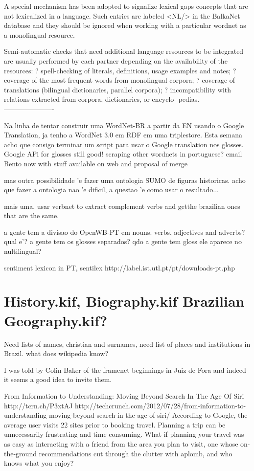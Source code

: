 {{A special mechanism has been adopted to signalize lexical gaps  concepts that
are not lexicalized in a language. Such entries are labeled <NL/> in the BalkaNet
database and they should be ignored when working with a particular wordnet as a
monolingual resource.

Semi-automatic checks that need additional language resources to be integrated
are usually performed by each partner depending on the availability of the resources:
? spell-checking of literals, definitions, usage examples and notes;
? coverage of the most frequent words from monolingual corpora;
? coverage of translations (bilingual dictionaries, parallel corpora);
? incompatibility with relations extracted from corpora, dictionaries, or encyclo-
pedias.
----------------------

 Na linha de tentar construir uma WordNet-BR a partir da EN usando o Google Translation, ja tenho a WordNet 3.0 em RDF em uma triplestore. Esta semana acho que consigo terminar um script para usar o Google translation nos glosses.
 Google APi for glosses still good!
 scraping other wordnets in portuguese?
 email Bento now with stuff available on web and proposal of merge
 
 mas outra possibilidade 'e fazer uma ontologia SUMO de figuras historicas. acho que fazer a ontologia nao 'e dificil, a questao 'e como usar o resultado...
 
 mais uma, usar  verbnet to extract complement verbs and getthe brazilian ones that are the same.
 
 a gente tem a divisao do OpenWB-PT em nouns. verbs, adjectives and adverbs?
 qual e'?
 a gente tem os glosses separados? qdo a gente tem gloss ele aparece no nultilingual?
 
 sentiment lexicon in PT, sentilex
 http://label.ist.utl.pt/pt/downloads-pt.php
 

\section{History.kif, Biography.kif Brazilian Geography.kif?}

Need lists of names, christian and surnames, need list of places and institutions in Brazil. what does wikipedia know?

 I was told by Colin Baker of the framenet beginnings in Juiz de Fora
and indeed it seems a good idea to invite them.

From Information to Understanding: Moving Beyond Search In The Age Of Siri http://tcrn.ch/P3xtAJ
http://techcrunch.com/2012/07/28/from-information-to-understanding-moving-beyond-search-in-the-age-of-siri/
According to Google, the average user visits 22 sites prior to booking travel. Planning a trip can be unnecessarily frustrating and time consuming. What if planning your travel was as easy as interacting with a friend from the area you plan to visit, one whose on-the-ground recommendations cut through the clutter with aplomb, and who knows what you enjoy?

}}
